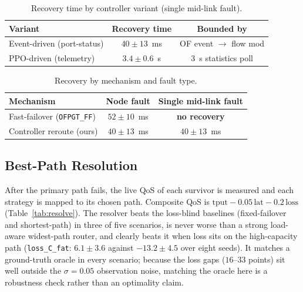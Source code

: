 \documentclass[12pt,a4paper]{report}
\begin{document}
\begin{table}[t]
\centering
\caption{Recovery time by controller variant (single mid-link fault).}
\label{tab:variants}
\begin{tabular}{lcc}
\toprule
Variant & Recovery time & Bounded by \\
\midrule
Event-driven (port-status) & $40\pm13$~ms & OF event $\rightarrow$ flow mod \\
PPO-driven (telemetry) & $3.4\pm0.6$~s & 3~s statistics poll \\
\bottomrule
\end{tabular}
\end{table}

\begin{table}[t]
\centering
\caption{Recovery by mechanism and fault type.}
\label{tab:offail}
\begin{tabular}{lcc}
\toprule
Mechanism & Node fault & Single mid-link fault \\
\midrule
Fast-failover (\texttt{OFPGT\_FF}) & $52\pm10$~ms & \textbf{no recovery} \\
Controller reroute (ours) & $40\pm13$~ms & $40\pm13$~ms \\
\bottomrule
\end{tabular}
\end{table}

\subsection{Best-Path Resolution}
After the primary path fails, the live QoS of each survivor is measured and each strategy is
mapped to its chosen path. Composite QoS is $\text{tput}-0.05\,\text{lat}-0.2\,\text{loss}$
(Table~\ref{tab:resolve}). The resolver beats the loss-blind baselines (fixed-failover and
shortest-path) in three of five scenarios, is never worse than a strong load-aware
widest-path router, and clearly beats it when loss sits on the high-capacity path
(\texttt{loss\_C\_fat}: $6.1\pm3.6$ against $-13.2\pm4.5$ over eight seeds). It matches a
ground-truth oracle in every scenario; because the loss gaps ($16$--$33$ points) sit well
outside the $\sigma=0.05$ observation noise, matching the oracle here is a robustness check
rather than an optimality claim. %
\end{document}
